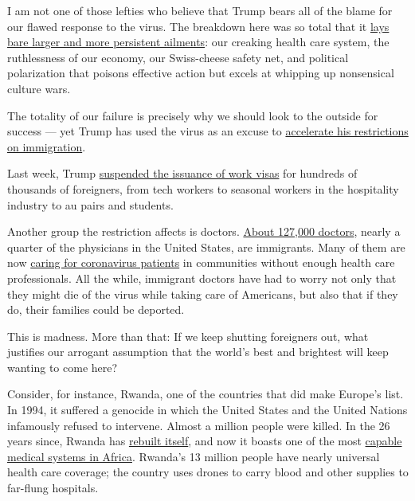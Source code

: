 I am not one of those lefties who believe that Trump bears all of the
blame for our flawed response to the virus. The breakdown here was so
total that it
\href{https://www.theatlantic.com/magazine/archive/2020/06/underlying-conditions/610261/}{lays
bare larger and more persistent ailments}: our creaking health care
system, the ruthlessness of our economy, our Swiss-cheese safety net,
and political polarization that poisons effective action but excels at
whipping up nonsensical culture wars.

The totality of our failure is precisely why we should look to the
outside for success --- yet Trump has used the virus as an excuse to
\href{https://www.nytimes.com/2020/06/12/us/politics/coronavirus-trump-immigration-policies.html}{accelerate
his restrictions on immigration}.

Last week, Trump
\href{https://www.nytimes.com/2020/06/22/us/politics/trump-h1b-work-visas.html}{suspended
the issuance of work visas} for hundreds of thousands of foreigners,
from tech workers to seasonal workers in the hospitality industry to au
pairs and students.

Another group the restriction affects is doctors.
\href{https://www.nbcnews.com/news/asian-america/fear-deportation-heightened-immigrant-doctors-h-1b-visas-amid-pandemic-n1204791}{About
127,000 doctors}, nearly a quarter of the physicians in the United
States, are immigrants. Many of them are now
\href{https://www.motherjones.com/coronavirus-updates/2020/06/immigrant-h1b-doctors-coronavirus-green-card/}{caring
for coronavirus patients} in communities without enough health care
professionals. All the while, immigrant doctors have had to worry not
only that they might die of the virus while taking care of Americans,
but also that if they do, their families could be deported.

This is madness. More than that: If we keep shutting foreigners out,
what justifies our arrogant assumption that the world's best and
brightest will keep wanting to come here?

Consider, for instance, Rwanda, one of the countries that did make
Europe's list. In 1994, it suffered a genocide in which the United
States and the United Nations infamously refused to intervene. Almost a
million people were killed. In the 26 years since, Rwanda has
\href{https://www.nytimes.com/2019/04/06/world/africa/rwanda-genocide-25-years.html}{rebuilt
itself}, and now it boasts one of the most
\href{https://www.atlanticcouncil.org/blogs/africasource/rwandas-successes-and-challenges-in-response-to-covid-19/}{capable
medical systems in Africa}. Rwanda's 13 million people have nearly
universal health care coverage; the country uses drones to carry blood
and other supplies to far-flung hospitals.

